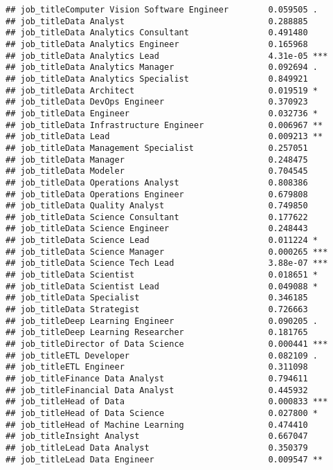 \documentclass[
]{article}
\begin{document}
\begin{verbatim}
## job_titleComputer Vision Software Engineer        0.059505 .  
## job_titleData Analyst                             0.288885    
## job_titleData Analytics Consultant                0.491480    
## job_titleData Analytics Engineer                  0.165968    
## job_titleData Analytics Lead                      4.31e-05 ***
## job_titleData Analytics Manager                   0.092694 .  
## job_titleData Analytics Specialist                0.849921    
## job_titleData Architect                           0.019519 *  
## job_titleData DevOps Engineer                     0.370923    
## job_titleData Engineer                            0.032736 *  
## job_titleData Infrastructure Engineer             0.006967 ** 
## job_titleData Lead                                0.009213 ** 
## job_titleData Management Specialist               0.257051    
## job_titleData Manager                             0.248475    
## job_titleData Modeler                             0.704545    
## job_titleData Operations Analyst                  0.808386    
## job_titleData Operations Engineer                 0.679808    
## job_titleData Quality Analyst                     0.749850    
## job_titleData Science Consultant                  0.177622    
## job_titleData Science Engineer                    0.248443    
## job_titleData Science Lead                        0.011224 *  
## job_titleData Science Manager                     0.000265 ***
## job_titleData Science Tech Lead                   3.88e-07 ***
## job_titleData Scientist                           0.018651 *  
## job_titleData Scientist Lead                      0.049088 *  
## job_titleData Specialist                          0.346185    
## job_titleData Strategist                          0.726663    
## job_titleDeep Learning Engineer                   0.090205 .  
## job_titleDeep Learning Researcher                 0.181765    
## job_titleDirector of Data Science                 0.000441 ***
## job_titleETL Developer                            0.082109 .  
## job_titleETL Engineer                             0.311098    
## job_titleFinance Data Analyst                     0.794611    
## job_titleFinancial Data Analyst                   0.445932    
## job_titleHead of Data                             0.000833 ***
## job_titleHead of Data Science                     0.027800 *  
## job_titleHead of Machine Learning                 0.474410    
## job_titleInsight Analyst                          0.667047    
## job_titleLead Data Analyst                        0.350379    
## job_titleLead Data Engineer                       0.009547 ** 

\end{verbatim}
\end{document}
